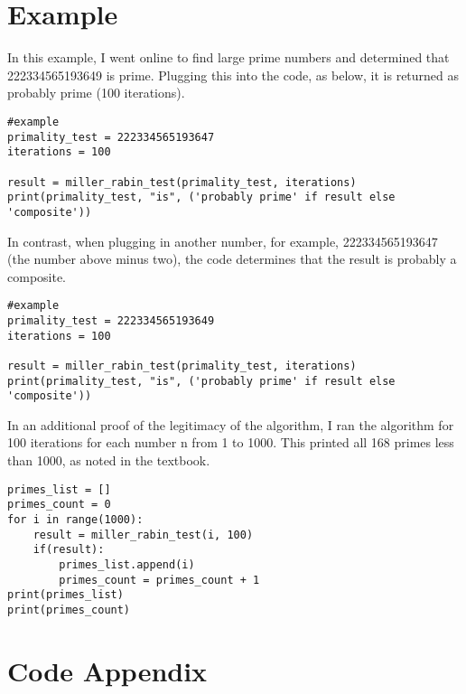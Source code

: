 \documentclass[11pt,a4paper]{article}
\begin{document}
\clearpage

\section{Example}

In this example, I went online to find large prime numbers and determined that 222334565193649 is prime. Plugging this into the code, as below, it is returned as probably prime (100 iterations). 

\begin{lstlisting}
#example
primality_test = 222334565193647  
iterations = 100       

result = miller_rabin_test(primality_test, iterations)
print(primality_test, "is", ('probably prime' if result else 'composite'))
\end{lstlisting}

In contrast, when plugging in another number, for example, 222334565193647 (the number above minus two), the code determines that the result is probably a composite. 

\begin{lstlisting}
#example
primality_test = 222334565193649 
iterations = 100       

result = miller_rabin_test(primality_test, iterations)
print(primality_test, "is", ('probably prime' if result else 'composite'))
\end{lstlisting}

In an additional proof of the legitimacy of the algorithm, I ran the algorithm for 100 iterations for each number n from 1 to 1000. This printed all 168 primes less than 1000, as noted in the textbook.  

\begin{lstlisting}
primes_list = []
primes_count = 0
for i in range(1000):
    result = miller_rabin_test(i, 100)
    if(result):
        primes_list.append(i)
        primes_count = primes_count + 1
print(primes_list)
print(primes_count)
\end{lstlisting}

\clearpage

\section{Code Appendix}
\end{document}
